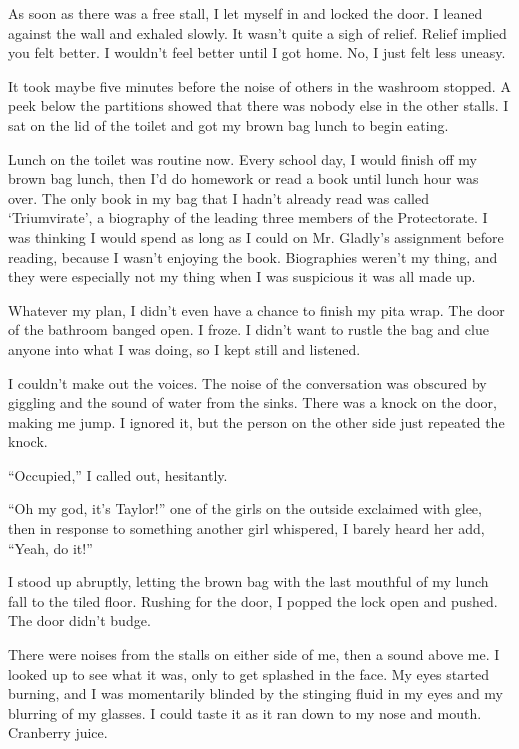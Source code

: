 As soon as there was a free stall, I let myself in and locked the door.   I leaned against the wall and exhaled slowly.  It wasn't quite a sigh of relief.  Relief implied you felt better.  I wouldn't feel better until I got home.  No, I just felt less uneasy.



It took maybe five minutes before the noise of others in the washroom stopped.  A peek below the partitions showed that there was nobody else in the other stalls.  I sat on the lid of the toilet and got my brown bag lunch to begin eating.



Lunch on the toilet was routine now.  Every school day, I would finish off my brown bag lunch, then I'd do homework or read a book until lunch hour was over.  The only book in my bag that I hadn't already read was called `Triumvirate', a biography of the leading three members of the Protectorate.  I was thinking I would spend as long as I could on Mr. Gladly's assignment before reading, because I wasn't enjoying the book.  Biographies weren't my thing, and they were especially not my thing when I was suspicious it was all made up.



Whatever my plan, I didn't even have a chance to finish my pita wrap.  The door of the bathroom banged open.  I froze.  I didn't want to rustle the bag and clue anyone into what I was doing, so I kept still and listened.



I couldn't make out the voices.  The noise of the conversation was obscured by giggling and the sound of water from the sinks.  There was a knock on the door, making me jump.  I ignored it, but the person on the other side just repeated the knock.



``Occupied,'' I called out, hesitantly.



``Oh my god, it's Taylor!'' one of the girls on the outside exclaimed with glee, then in response to something another girl whispered, I barely heard her add, ``Yeah, do it!''



I stood up abruptly, letting the brown bag with the last mouthful of my lunch fall to the tiled floor.  Rushing for the door, I popped the lock open and pushed.  The door didn't budge.



There were noises from the stalls on either side of me, then a sound above me.  I looked up to see what it was, only to get splashed in the face.  My eyes started burning, and I was momentarily blinded by the stinging fluid in my eyes and my blurring of my glasses.  I could taste it as it ran down to my nose and mouth.  Cranberry juice.



